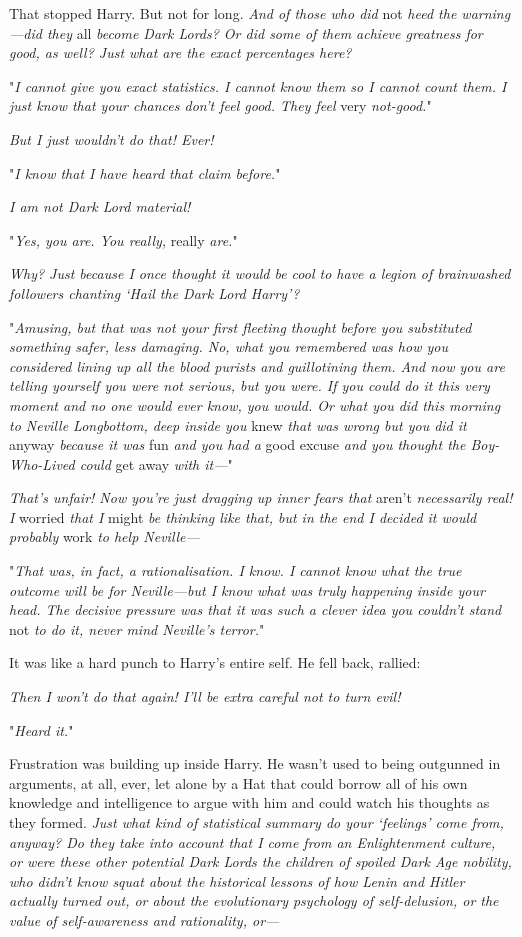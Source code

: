 That stopped Harry. But not for long. \emph{And of those who did} not \emph{
heed the warning---did they} all \emph{become Dark Lords? Or did some of them 
achieve greatness for good, as well? Just what are the exact percentages here?}

"\emph{I cannot give you exact statistics. I cannot know them so I cannot count 
them. I just know that your chances don't feel good. They feel} very \emph{
not-good.}"

\emph{But I just wouldn't do that! Ever!}

"\emph{I know that I have heard that claim before.}"

\emph{I am not Dark Lord material!}

"\emph{Yes, you are. You really,} really \emph{are.}"

\emph{Why? Just because I once thought it would be cool to have a legion of 
brainwashed followers chanting `Hail the Dark Lord Harry'?}

"\emph{Amusing, but that was not your first fleeting thought before you 
substituted something safer, less damaging. No, what you remembered was how you 
considered lining up all the blood purists and guillotining them. And now you 
are telling yourself you were not serious, but you were. If you could do it 
this very moment and no one would ever know, you would. Or what you did this 
morning to Neville Longbottom, deep inside you} knew \emph{that was wrong but 
you did it} anyway \emph{because it was} fun \emph{and you had a} good 
excuse \emph{and you thought the Boy-Who-Lived could} get away \emph{with 
it---}"

\emph{That's unfair! Now you're just dragging up inner fears that} aren't \emph{
necessarily real! I} worried \emph{that I} might \emph{be thinking like that, 
but in the end I decided it would probably} work \emph{to help Neville---}

"\emph{That was, in fact, a rationalisation. I know. I cannot know what the 
true outcome will be for Neville---but I know what was truly happening inside 
your head. The decisive pressure was that it was such a clever idea you 
couldn't stand} not \emph{to do it, never mind Neville's terror.}"

It was like a hard punch to Harry's entire self. He fell back, rallied:

\emph{Then I won't do that again! I'll be extra careful not to turn evil!}

"\emph{Heard it.}"

Frustration was building up inside Harry. He wasn't used to being outgunned in 
arguments, at all, ever, let alone by a Hat that could borrow all of his own 
knowledge and intelligence to argue with him and could watch his thoughts as 
they formed. \emph{Just what kind of statistical summary do your `feelings' 
come from, anyway? Do they take into account that I come from an Enlightenment 
culture, or were these other potential Dark Lords the children of spoiled Dark 
Age nobility, who didn't know squat about the historical lessons of how Lenin 
and Hitler actually turned out, or about the evolutionary psychology of 
self-delusion, or the value of self-awareness and rationality, or---}

